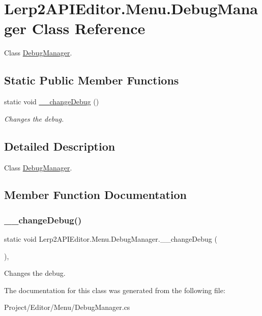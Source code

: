 \hypertarget{class_lerp2_a_p_i_editor_1_1_menu_1_1_debug_manager}{}\section{Lerp2\+A\+P\+I\+Editor.\+Menu.\+Debug\+Manager Class Reference}
\label{class_lerp2_a_p_i_editor_1_1_menu_1_1_debug_manager}


Class \hyperlink{class_lerp2_a_p_i_editor_1_1_menu_1_1_debug_manager}{Debug\+Manager}.  


\subsection*{Static Public Member Functions}
\begin{DoxyCompactItemize}
\item 
static void \hyperlink{class_lerp2_a_p_i_editor_1_1_menu_1_1_debug_manager_ab308987e82fc9423fd069cd5dfac0e7a}{\+\_\+\+\_\+change\+Debug} ()
\begin{DoxyCompactList}\small\item\em Changes the debug. \end{DoxyCompactList}\end{DoxyCompactItemize}


\subsection{Detailed Description}
Class \hyperlink{class_lerp2_a_p_i_editor_1_1_menu_1_1_debug_manager}{Debug\+Manager}. 



\subsection{Member Function Documentation}
\mbox{\label{class_lerp2_a_p_i_editor_1_1_menu_1_1_debug_manager_ab308987e82fc9423fd069cd5dfac0e7a}} 
\subsubsection{\texorpdfstring{\+\_\+\+\_\+change\+Debug()}{\_\_changeDebug()}}
{\footnotesize\ttfamily static void Lerp2\+A\+P\+I\+Editor.\+Menu.\+Debug\+Manager.\+\_\+\+\_\+change\+Debug (\begin{DoxyParamCaption}{ }\end{DoxyParamCaption})\hspace{0.3cm}{\ttfamily [inline]}, {\ttfamily [static]}}



Changes the debug. 



The documentation for this class was generated from the following file\+:\begin{DoxyCompactItemize}
\item 
Project/\+Editor/\+Menu/Debug\+Manager.\+cs\end{DoxyCompactItemize}
